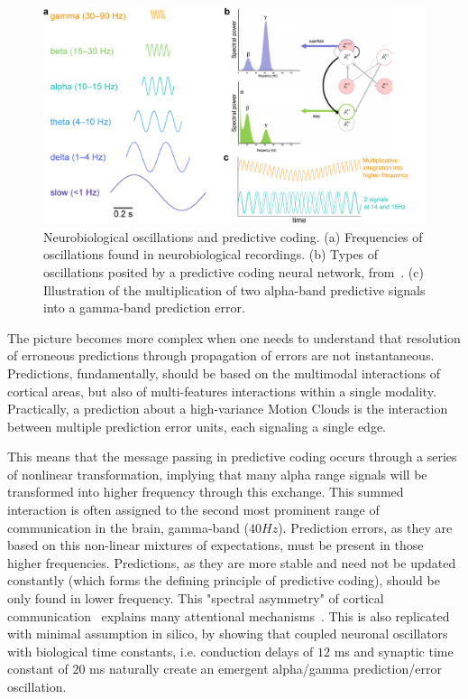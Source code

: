 \begin{figure}[h!tbp]
\centering
\includegraphics[width=1.\textwidth]{fig/fig_chap7_oscillations.pdf}
\caption[Neurobiological oscillations.]{Neurobiological oscillations and predictive coding. (a) Frequencies of oscillations found in neurobiological recordings. (b) Types of oscillations posited by a predictive coding neural network, from~\cite{bastos2012canonical}. (c) Illustration of the multiplication of two alpha-band predictive signals into a gamma-band prediction error.}
\label{fig_chap7_oscillations}
\end{figure}%

The picture becomes more complex when one needs to understand that resolution of erroneous predictions through propagation of errors are not instantaneous. Predictions, fundamentally, should be based on the multimodal interactions of cortical areas, but also of multi-features interactions within a single modality. Practically, a prediction about a high-variance Motion Clouds is the interaction between multiple prediction error units, each signaling a single edge.

This means that the message passing in predictive coding occurs through a series of nonlinear transformation, implying that many alpha range signals will be transformed into higher frequency through this exchange. This summed interaction is often assigned to the second most prominent range of communication in the brain, gamma-band ($40 Hz$). Prediction errors, as they are based on this non-linear mixtures of expectations, must be present in those higher frequencies. Predictions, as they are more stable and need not be updated constantly (which forms the defining principle of predictive coding), should be only found in lower frequency. This "spectral asymmetry" of cortical communication~\cite{bastos2012canonical, bastos2015visual} explains many attentional mechanisms~\cite{kok2012attention}. This is also replicated with minimal assumption in silico, by showing that coupled neuronal oscillators with biological time constants, i.e. conduction delays of $12$ ms and synaptic time constant of $20$ ms naturally create an emergent alpha/gamma prediction/error oscillation.

